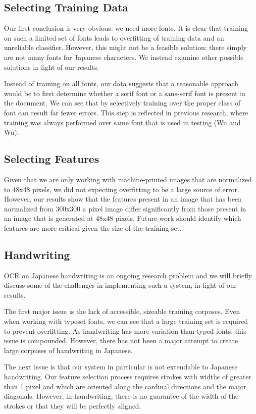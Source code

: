 \documentclass[10pt,twocolumn,letterpaper]{article}
\begin{document}
\subsection{Selecting Training Data}
Our first conclusion is very obvious: we need more fonts. It is clear that training on such a limited set of fonts leads to overfitting of training data and an unreliable classifier. However, this might not be a feasible solution: there simply are not many fonts for Japanese characters. We instead examine other possible solutions in light of our results.

Instead of training on all fonts, our data suggests that a reasonable approach would be to first determine whether a serif font or a sans-serif font is present in the document. We can see that by selectively training over the proper class of font can result far fewer errors. This step is reflected in previous research, where training was always performed over same font that is used in testing (Wu and Wu).

\subsection{Selecting Features}
Given that we are only working with machine-printed images that are normalized to 48x48 pixels, we did not expecting overfitting to be a large source of error. However, our results show that the features present in an image that has been normalized from 300x300 a pixel image differ significantly from those present in an image that is generated at 48x48 pixels. Future work should identify which features are more critical given the size of the training set.


\subsection{Handwriting}

OCR on Japanese handwriting is an ongoing research problem and we will briefly discuss some of the challenges in implementing such a system, in light of our results.

The first major issue is the lack of accessible, sizeable training corpuses. Even when working with typeset fonts, we can see that a large training set is required to prevent overfitting. As handwriting has more variation than typed fonts, this issue is compounded. However, there has not been a major attempt to create large corpuses of handwriting in Japanese.

The next issue is that our system in particular is not extendable to Japanese handwriting. Our feature selection process requires strokes with widths of greater than 1 pixel and which are oriented along the cardinal directions and the major diagonals. However, in handwriting, there is no guarantee of the width of the strokes or that they will be perfectly aligned.
\end{document}
